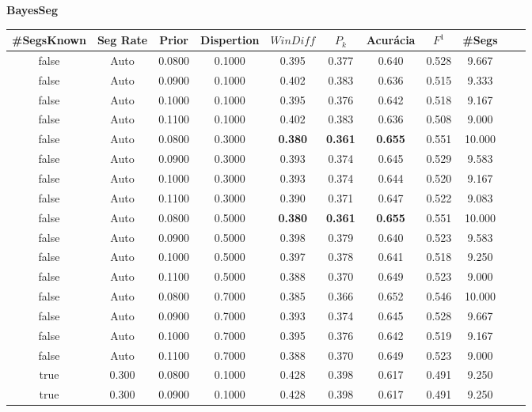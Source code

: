 \center
\textbf{BayesSeg}  
\begin{longtable}[c]{|c|c|c|c|c|c|c|c|c|c|c|} 
\hline 
 \#SegsKnown & Seg Rate & Prior & Dispertion & $WinDiff$ & $P_k$ & Acurácia & $F^1$ & \#Segs\\ \hline 
 false & Auto & 0.0800 & 0.1000 & 0.395 & 0.377 & 0.640 & 0.528 & 9.667  \\ \hline 
 false & Auto & 0.0900 & 0.1000 & 0.402 & 0.383 & 0.636 & 0.515 & 9.333  \\ \hline 
 false & Auto & 0.1000 & 0.1000 & 0.395 & 0.376 & 0.642 & 0.518 & 9.167  \\ \hline 
 false & Auto & 0.1100 & 0.1000 & 0.402 & 0.383 & 0.636 & 0.508 & 9.000  \\ \hline 
 false & Auto & 0.0800 & 0.3000 & \cellcolor{gray!20} \textbf{0.380} & \cellcolor{gray!20} \textbf{0.361} & \cellcolor{gray!20} \textbf{0.655} & 0.551 & 10.000  \\ \hline 
 false & Auto & 0.0900 & 0.3000 & 0.393 & 0.374 & 0.645 & 0.529 & 9.583  \\ \hline 
 false & Auto & 0.1000 & 0.3000 & 0.393 & 0.374 & 0.644 & 0.520 & 9.167  \\ \hline 
 false & Auto & 0.1100 & 0.3000 & 0.390 & 0.371 & 0.647 & 0.522 & 9.083  \\ \hline 
 false & Auto & 0.0800 & 0.5000 & \cellcolor{gray!20} \textbf{0.380} & \cellcolor{gray!20} \textbf{0.361} & \cellcolor{gray!20} \textbf{0.655} & 0.551 & 10.000  \\ \hline 
 false & Auto & 0.0900 & 0.5000 & 0.398 & 0.379 & 0.640 & 0.523 & 9.583  \\ \hline 
 false & Auto & 0.1000 & 0.5000 & 0.397 & 0.378 & 0.641 & 0.518 & 9.250  \\ \hline 
 false & Auto & 0.1100 & 0.5000 & 0.388 & 0.370 & 0.649 & 0.523 & 9.000  \\ \hline 
 false & Auto & 0.0800 & 0.7000 & 0.385 & 0.366 & 0.652 & 0.546 & 10.000  \\ \hline 
 false & Auto & 0.0900 & 0.7000 & 0.393 & 0.374 & 0.645 & 0.528 & 9.667  \\ \hline 
 false & Auto & 0.1000 & 0.7000 & 0.395 & 0.376 & 0.642 & 0.519 & 9.167  \\ \hline 
 false & Auto & 0.1100 & 0.7000 & 0.388 & 0.370 & 0.649 & 0.523 & 9.000  \\ \hline 
 true & 0.300 & 0.0800 & 0.1000 & 0.428 & 0.398 & 0.617 & 0.491 & 9.250  \\ \hline 
 true & 0.300 & 0.0900 & 0.1000 & 0.428 & 0.398 & 0.617 & 0.491 & 9.250  \\ \hline 

\end{longtable}
